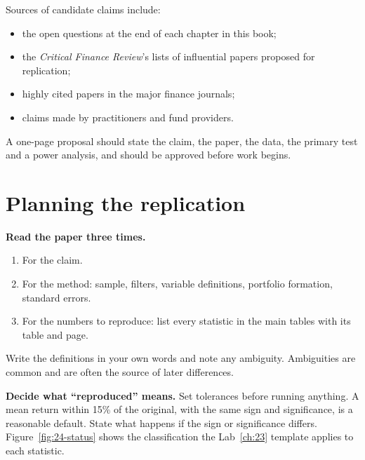 Sources of candidate claims include:

\begin{itemize}
  \item the open questions at the end of each chapter in this book;
  \item the \emph{Critical Finance Review}'s lists of influential papers proposed for replication;
  \item highly cited papers in the major finance journals;
  \item claims made by practitioners and fund providers.
\end{itemize}

A one-page proposal should state the claim, the paper, the data, the primary test and a power analysis, and should be approved before work begins.

\section{Planning the replication}
\label{sec:24-planning}

\textbf{Read the paper three times.}

\begin{enumerate}
  \item For the claim.
  \item For the method: sample, filters, variable definitions, portfolio formation, standard errors.
  \item For the numbers to reproduce: list every statistic in the main tables with its table and page.
\end{enumerate}

Write the definitions in your own words and note any ambiguity. Ambiguities are common and are often the source of later differences.

\textbf{Decide what ``reproduced'' means.} Set tolerances before running anything. A mean return within 15\% of the original, with the same sign and significance, is a reasonable default. State what happens if the sign or significance differs. Figure~\ref{fig:24-status} shows the classification the Lab~\ref{ch:23} template applies to each statistic.

